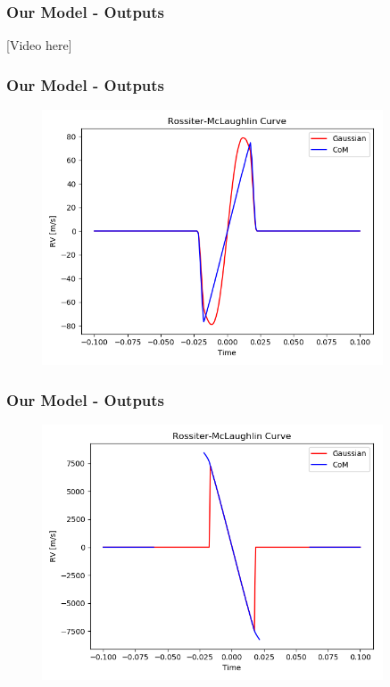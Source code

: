 \documentclass[show notes]{beamer}
\begin{document}

\begin{frame}
\frametitle{Our Model - Outputs}
	[Video here]
\end{frame}

\begin{frame}
\frametitle{Our Model - Outputs}

\begin{figure}
\centering
\includegraphics[width=0.9\textwidth]{../figures/animation1_rmcurve.png}
\end{figure}

\end{frame}

\begin{frame}
\frametitle{Our Model - Outputs}

\begin{figure}
\centering
\includegraphics[width=0.9\textwidth]{../figures/animation2_rmcurve.png}
\end{figure}

\end{frame}
\end{document}

